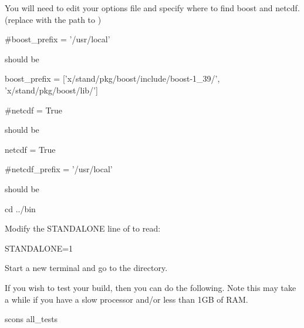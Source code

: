 You will need to edit your options file and specify where to find boost and netcdf.
(replace  with the path to )

\begin{python}
#boost_prefix = '/usr/local'
\end{python}

should be
\begin{python}
boost_prefix = ['x/stand/pkg/boost/include/boost-1_39/', 'x/stand/pkg/boost/lib/']
\end{python}

\begin{python}
#netcdf = True
\end{python}

should be
\begin{python}
netcdf = True
\end{python}

\begin{python}
#netcdf_prefix = '/usr/local'
\end{python}

should be \begin{python}
netcdf_prefix = ['x/stand/pkg/netcdf/include/', 
			'x/stand/pkg/netcdf/lib/']}
\end{python}

% 

\begin{shellCode}
cd ../bin
\end{shellCode}

Modify the STANDALONE line of  to read:
 
STANDALONE=1

Start a new terminal and go to the  directory.


If you wish to test your build, then you can do the following. 
Note this may take a while if you have a slow processor and/or less than 1GB of RAM.
\begin{shellCode}
scons all_tests
\end{shellCode}

